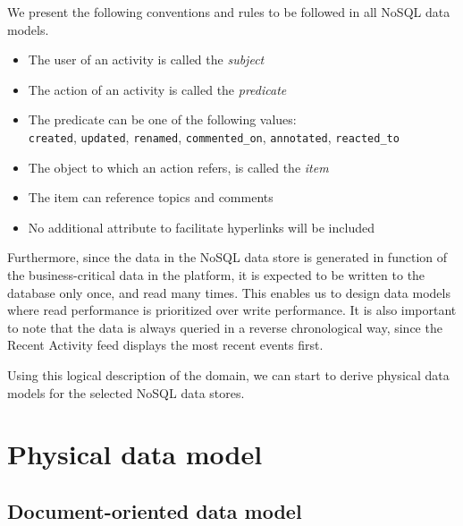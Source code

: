 We present the following conventions and rules to be followed in all NoSQL data models.

\begin{itemize}
  \item The user of an activity is called the \textit{subject}
  \item The action of an activity is called the \textit{predicate}
  \item The predicate can be one of the following values:\\ \texttt{created}, \texttt{updated}, \texttt{renamed}, \texttt{commented\_on}, \texttt{annotated}, \texttt{reacted\_to}
  \item The object to which an action refers, is called the \textit{item}
  \item The item can reference topics and comments
  \item No additional attribute to facilitate hyperlinks will be included
\end{itemize}

Furthermore, since the data in the NoSQL data store is generated in function of the business-critical data in the platform, it is expected to be written to the database only once, and read many times.
This enables us to design data models where read performance is prioritized over write performance.
It is also important to note that the data is always queried in a reverse chronological way, since the Recent Activity feed displays the most recent events first.

Using this logical description of the domain, we can start to derive physical data models for the selected NoSQL data stores.

\section{Physical data model}
\label{sec:physical-data-model}

\subsection{Document-oriented data model}
\label{subsec:document-data-model}



